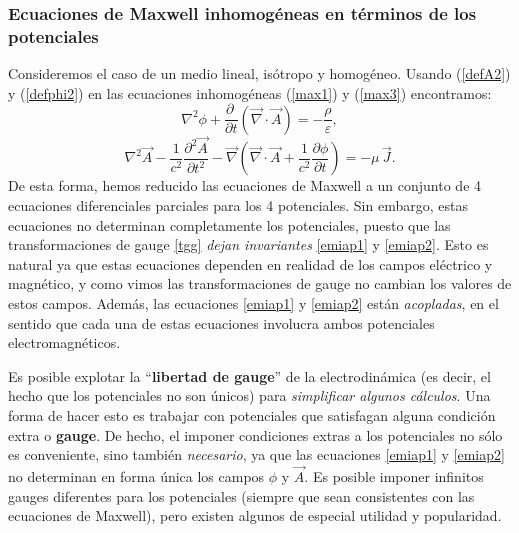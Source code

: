 \subsubsection{Ecuaciones de Maxwell inhomogéneas en términos de los
potenciales}
Consideremos el caso de un medio lineal, isótropo y homogéneo. Usando (\ref{defA2}) y (\ref{defphi2}) en las ecuaciones inhomogéneas (\ref{max1}) y (\ref{max3}) encontramos:
\begin{equation}\label{emiap1}
 \nabla^2\phi+\frac{\partial\ }{\partial t}\left(\vec{\nabla}\cdot\vec{A}\right)=-\frac{\rho}{\varepsilon},
\end{equation}
\begin{equation}\label{emiap2}
 \nabla^2\vec{A}-\frac{1}{c^2}\frac{\partial^2\vec{A}}{\partial t^2}-\vec{\nabla}\left(\vec{\nabla}\cdot\vec{A}+\frac{1}{c^2}\frac{\partial\phi }{\partial t}\right)=-\mu\,\vec{J}.
\end{equation}
De esta forma, hemos reducido las ecuaciones de Maxwell a un conjunto de 4 ecuaciones diferenciales parciales para los 4 potenciales. Sin embargo, estas ecuaciones no determinan completamente los potenciales, puesto que las transformaciones de gauge \eqref{tgg} \textit{dejan invariantes} \eqref{emiap1} y \eqref{emiap2}. Esto es natural ya que estas ecuaciones dependen en realidad de los campos eléctrico y magnético, y como vimos las transformaciones de gauge no cambian los valores de estos campos. Además, las ecuaciones \eqref{emiap1} y \eqref{emiap2} están \textit{acopladas}, en el sentido que cada una de estas ecuaciones involucra ambos potenciales electromagnéticos.

Es posible explotar la ``\textbf{libertad de gauge}'' de la electrodinámica (es decir, el hecho que los potenciales no son únicos) para \textit{simplificar algunos cálculos}. Una forma de hacer esto es trabajar con potenciales que satisfagan alguna condición extra o \textbf{gauge}. De hecho, el imponer condiciones extras a los potenciales no sólo es conveniente, sino también \textit{necesario}, ya que las ecuaciones \eqref{emiap1} y \eqref{emiap2} no determinan en forma única los campos $\phi$ y $\vec{A}$. Es posible imponer infinitos gauges diferentes para los potenciales (siempre que sean consistentes con las ecuaciones de Maxwell), pero existen algunos de especial utilidad y popularidad.


